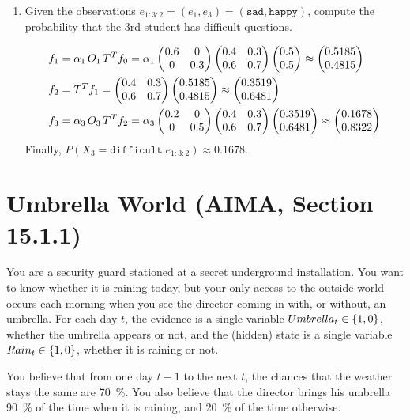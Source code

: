\documentclass[11pt, a4paper]{article}
\begin{document}
\begin{enumerate}
    \item Given the observations $e_{1:3:2} = (e_1, e_3) = (\texttt{sad}, \texttt{happy})$, compute the probability that the 3rd student has difficult questions.
    \begin{solution}
        \begin{align*}
            f_1 & = \alpha_1 \, O_1 \, T^T f_0 = \alpha_1 \begin{pmatrix}0.6 & 0 \\ 0 & 0.3\end{pmatrix} \begin{pmatrix}0.4 & 0.3 \\ 0.6 & 0.7\end{pmatrix} \begin{pmatrix}0.5 \\ 0.5\end{pmatrix} \approx \begin{pmatrix}0.5185 \\ 0.4815\end{pmatrix} \\
            f_2 & = T^T f_1 = \begin{pmatrix}0.4 & 0.3 \\ 0.6 & 0.7\end{pmatrix} \begin{pmatrix}0.5185 \\ 0.4815\end{pmatrix} \approx \begin{pmatrix}0.3519 \\ 0.6481\end{pmatrix} \\
            f_3 & = \alpha_3 \, O_3 \, T^T f_2 = \alpha_3 \begin{pmatrix}0.2 & 0 \\ 0 & 0.5\end{pmatrix} \begin{pmatrix}0.4 & 0.3 \\ 0.6 & 0.7\end{pmatrix} \begin{pmatrix}0.3519 \\ 0.6481\end{pmatrix} \approx \begin{pmatrix}0.1678 \\ 0.8322\end{pmatrix} \\
        \end{align*}
        Finally, $P(X_3 = \texttt{difficult} | e_{1:3:2}) \approx 0.1678$.
    \end{solution}
\end{enumerate}

\newpage

\section{Umbrella World (AIMA, Section 15.1.1)}

You are a security guard stationed at a secret underground installation. You want to know whether it is raining today, but your only access to the outside world occurs each morning when you see the director coming in with, or without, an umbrella. For each day $t$, the evidence is a single variable $Umbrella_t \in \{1, 0\}$, \ie{} whether the umbrella appears or not, and the (hidden) state is a single variable $Rain_t \in \{1, 0\}$, \ie{} whether it is raining or not.

You believe that from one day $t - 1$ to the next $t$, the chances that the weather stays the same are \SI{70}{\percent}. You also believe that the director brings his umbrella \SI{90}{\percent} of the time when it is raining, and \SI{20}{\percent} of the time otherwise.
\end{document}
